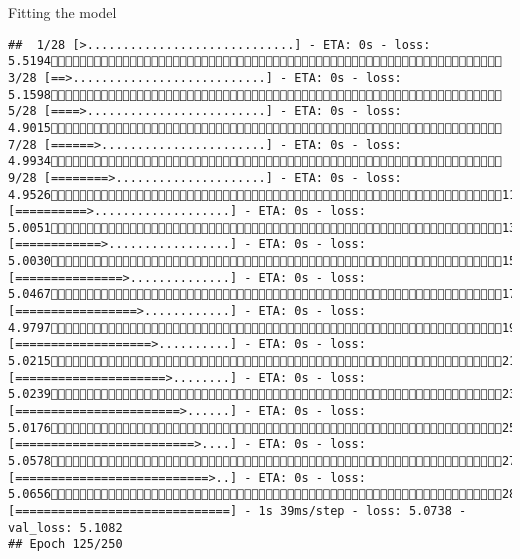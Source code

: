 \documentclass[
  ignorenonframetext,
]{beamer}
\begin{document}
\begin{frame}[fragile]{Fitting the model}
\begin{verbatim}
##  1/28 [>.............................] - ETA: 0s - loss: 5.5194 3/28 [==>...........................] - ETA: 0s - loss: 5.1598 5/28 [====>.........................] - ETA: 0s - loss: 4.9015 7/28 [======>.......................] - ETA: 0s - loss: 4.9934 9/28 [========>.....................] - ETA: 0s - loss: 4.952611/28 [==========>...................] - ETA: 0s - loss: 5.005113/28 [============>.................] - ETA: 0s - loss: 5.003015/28 [===============>..............] - ETA: 0s - loss: 5.046717/28 [=================>............] - ETA: 0s - loss: 4.979719/28 [===================>..........] - ETA: 0s - loss: 5.021521/28 [=====================>........] - ETA: 0s - loss: 5.023923/28 [=======================>......] - ETA: 0s - loss: 5.017625/28 [=========================>....] - ETA: 0s - loss: 5.057827/28 [===========================>..] - ETA: 0s - loss: 5.065628/28 [==============================] - 1s 39ms/step - loss: 5.0738 - val_loss: 5.1082
## Epoch 125/250

\end{verbatim}
\end{frame}
\end{document}

